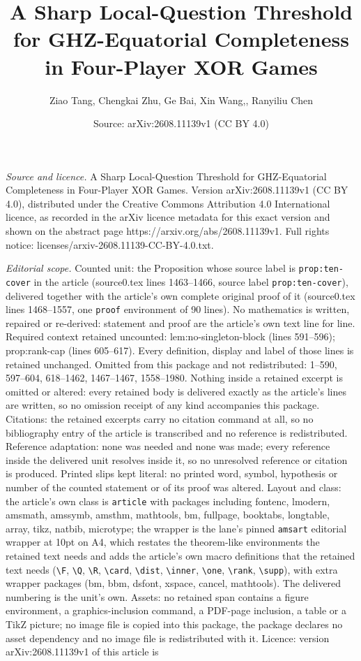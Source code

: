 \documentclass[10pt,a4paper]{amsart}
\title[A Sharp Local-Question Threshold for GHZ-Equatorial Complete]{A Sharp Local-Question Threshold for GHZ-Equatorial Completeness in Four-Player XOR Games}
\author{Ziao Tang, Chengkai Zhu, Ge Bai, Xin Wang,, Ranyiliu Chen}
\date{Source: arXiv:2608.11139v1 (CC BY 4.0)}
\begin{document}
\maketitle

\noindent\emph{Source and licence.} A Sharp Local-Question Threshold for GHZ-Equatorial Completeness in Four-Player XOR Games. Version arXiv:2608.11139v1 (CC BY 4.0), distributed under the Creative Commons Attribution 4.0 International licence, as recorded in the arXiv licence metadata for this exact version and shown on the abstract page https://arxiv.org/abs/2608.11139v1. Full rights notice: licenses/arxiv-2608.11139-CC-BY-4.0.txt.\par\smallskip

\noindent\textit{Editorial scope.} Counted unit: the Proposition whose source label is \texttt{prop:ten-cover} in the article (source0.tex lines 1463--1466, source label \texttt{prop:ten-cover}), delivered together with the article's own complete original proof of it (source0.tex lines 1468--1557, one \texttt{proof} environment of 90 lines). No mathematics is written, repaired or re-derived: statement and proof are the article's own text line for line. Required context retained uncounted: lem:no-singleton-block (lines 591--596); prop:rank-cap (lines 605--617). Every definition, display and label of those lines is retained unchanged. Omitted from this package and not redistributed: 1--590, 597--604, 618--1462, 1467--1467, 1558--1980. Nothing inside a retained excerpt is omitted or altered: every retained body is delivered exactly as the article's lines are written, so no omission receipt of any kind accompanies this package. Citations: the retained excerpts carry no citation command at all, so no bibliography entry of the article is transcribed and no reference is redistributed. Reference adaptation: none was needed and none was made; every reference inside the delivered unit resolves inside it, so no unresolved reference or citation is produced. Printed slips kept literal: no printed word, symbol, hypothesis or number of the counted statement or of its proof was altered. Layout and class: the article's own class is \texttt{article} with packages including fontenc, lmodern, amsmath, amssymb, amsthm, mathtools, bm, fullpage, booktabs, longtable, array, tikz, natbib, microtype; the wrapper is the lane's pinned \texttt{amsart} editorial wrapper at 10pt on A4, which restates the theorem-like environments the retained text needs and adds the article's own macro definitions that the retained text needs (\texttt{\textbackslash F}, \texttt{\textbackslash Q}, \texttt{\textbackslash R}, \texttt{\textbackslash card}, \texttt{\textbackslash dist}, \texttt{\textbackslash inner}, \texttt{\textbackslash one}, \texttt{\textbackslash rank}, \texttt{\textbackslash supp}), with extra wrapper packages (bm, bbm, dsfont, xspace, cancel, mathtools). The delivered numbering is the unit's own. Assets: no retained span contains a figure environment, a graphics-inclusion command, a PDF-page inclusion, a table or a TikZ picture; no image file is copied into this package, the package declares no asset dependency and no image file is redistributed with it. Licence: version arXiv:2608.11139v1 of this article is 
\end{document}
